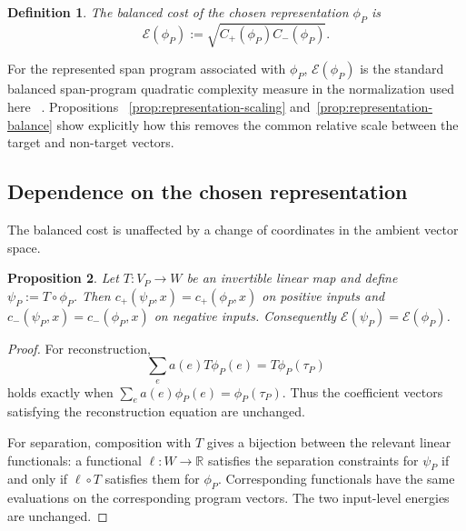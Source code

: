 \documentclass[11pt]{article}
\numberwithin{equation}{section}
\newtheorem{definition}{Definition}[section]
\newtheorem{proposition}[definition]{Proposition}
\theoremstyle{remark}
\begin{document}
\begin{definition}
\label{def:representation-cost}
The \emph{balanced cost} of the chosen representation $\phi_P$ is
\begin{equation}
    \mathcal E(\phi_P)
    :=
    \sqrt{
        C_+(\phi_P)C_-(\phi_P)
    }.
\end{equation}
\end{definition}

For the represented span program associated with $\phi_P$,
$\mathcal E(\phi_P)$ is the standard balanced span-program quadratic
complexity measure in the normalization used here
~\cite{ReichardtSpalek2008,Reichardt2009}. Propositions
~\ref{prop:representation-scaling} and~\ref{prop:representation-balance}
show explicitly how this removes the common relative scale between the target
and non-target vectors.


\subsection{Dependence on the chosen representation}
\label{subsec:representation-dependence}

The balanced cost is unaffected by a change of coordinates in the ambient
vector space.

\begin{proposition}
\label{prop:representation-coordinate-invariance}
Let $T:V_P\to W$ be an invertible linear map and define
$\psi_P:=T\circ\phi_P$. Then
$c_+(\psi_P,x)=c_+(\phi_P,x)$ on positive inputs and
$c_-(\psi_P,x)=c_-(\phi_P,x)$ on negative inputs. Consequently
$\mathcal E(\psi_P)=\mathcal E(\phi_P)$.
\end{proposition}

\begin{proof}
For reconstruction,
\begin{equation}
    \sum_e a(e)T\phi_P(e)
    =
    T\phi_P(\tau_P)
\end{equation}
holds exactly when
$\sum_e a(e)\phi_P(e)=\phi_P(\tau_P)$. Thus the coefficient vectors satisfying the reconstruction equation
are unchanged.

For separation, composition with $T$ gives a bijection between the relevant
linear functionals: a functional $\ell:W\to\mathbb R$ satisfies the separation constraints for
$\psi_P$ if and only if $\ell\circ T$ satisfies them for $\phi_P$. Corresponding
functionals have the same evaluations on the corresponding program vectors.
The two input-level energies are unchanged.
\end{proof}
\end{document}
